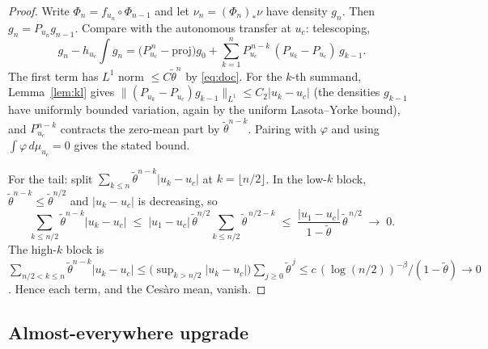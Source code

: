 \documentclass[11pt,a4paper]{article}
\theoremstyle{definition}
\begin{document}
\begin{proof}
Write $\Phi_n = f_{u_n} \circ \Phi_{n-1}$ and let $\nu_n = (\Phi_n)_*\nu$
have density $g_n$. Then $g_n = P_{u_n} g_{n-1}$. Compare with the
autonomous transfer at $u_c$: telescoping,
\[
  g_n - h_{u_c}\!\!\int g_n
  = \bigl(P_{u_c}^{\,n} - \text{proj}\bigr) g_0
    + \sum_{k=1}^{n} P_{u_c}^{\,n-k}\,(P_{u_k} - P_{u_c})\, g_{k-1}.
\]
The first term has $L^1$ norm $\leq C \tilde\theta^n$ by
\eqref{eq:doc}. For the $k$-th summand, Lemma~\ref{lem:kl} gives
$\|(P_{u_k} - P_{u_c})g_{k-1}\|_{L^1} \leq C_2 |u_k - u_c|$ (the
densities $g_{k-1}$ have uniformly bounded variation, again by the
uniform Lasota--Yorke bound), and $P_{u_c}^{n-k}$ contracts the
zero-mean part by $\tilde\theta^{n-k}$. Pairing with $\varphi$ and
using $\int \varphi\, d\mu_{u_c} = 0$ gives the stated bound.

For the tail: split $\sum_{k\le n}\tilde\theta^{n-k}|u_k-u_c|$ at
$k = \lfloor n/2 \rfloor$. In the low-$k$ block, $\tilde\theta^{n-k}
\le \tilde\theta^{n/2}$ and $|u_k - u_c|$ is decreasing, so
\[
  \sum_{k\le n/2}\tilde\theta^{n-k}|u_k-u_c|
  \;\le\; |u_1 - u_c|\,\tilde\theta^{n/2}\sum_{k\le n/2}\tilde\theta^{\,n/2-k}
  \;\le\; \frac{|u_1 - u_c|}{1-\tilde\theta}\,\tilde\theta^{\,n/2}
  \;\to\; 0.
\]
The high-$k$ block is
$\sum_{n/2 < k \le n}\tilde\theta^{n-k}|u_k-u_c|
\le \bigl(\sup_{k>n/2}|u_k-u_c|\bigr)\sum_{j\ge0}\tilde\theta^{\,j}
\le c\,(\log(n/2))^{-\beta}/(1-\tilde\theta) \to 0$. Hence each term,
and the Cesàro mean, vanish.
\end{proof}

\subsection{Almost-everywhere upgrade}
\end{document}
